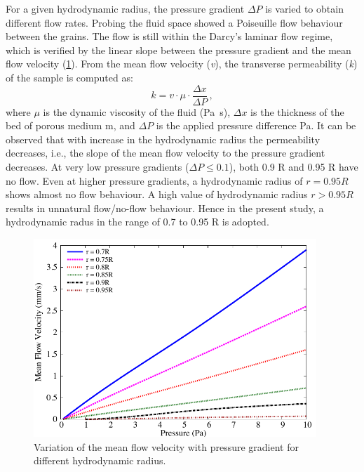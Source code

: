 For a given hydrodynamic radius, the 
pressure gradient $\Delta P$ is varied to obtain different flow rates. Probing 
the fluid space showed a Poiseuille flow behaviour between the grains. The flow 
is still within the Darcy's laminar flow regime, which is verified by the 
linear slope between the pressure gradient and the mean flow velocity 
(\cref{fig:permeability}). From the mean flow velocity (\textit{v}), 
the transverse permeability (\textit{k}) of the sample is computed as:
%
\begin{equation}
k=v\cdot\mu\cdot\frac{\Delta x}{\Delta P} \,,
\end{equation}
%
where $\mu$ is the dynamic viscosity of the fluid (\si{\Pa\s}), $\Delta x$ is 
the thickness of the bed of porous medium \si{\m}, and $\Delta P$ is the 
applied pressure difference \si{\Pa}. It can be observed that with increase in 
the hydrodynamic radius the permeability decreases, i.e., the slope of the mean 
flow velocity to the pressure gradient decreases. At very low pressure 
gradients 
($\Delta P \le 0.1$), both 0.9 R and 0.95 R have no flow. Even at 
higher pressure gradients, a hydrodynamic radius of $r = 0.95R$ shows almost no 
flow behaviour. A high value of hydrodynamic radius $r > 0.95R$ 
results in unnatural flow/no-flow behaviour. Hence in the present study, a 
hydrodynamic radus in the range of 0.7 to 0.95 R is adopted.

\begin{figure}[htpb]
\centering
\includegraphics[width=0.95\textwidth]{Permeability}
\caption{Variation of the mean flow velocity with pressure gradient for 
different hydrodynamic radius.}
\label{fig:permeability}
\end{figure}


